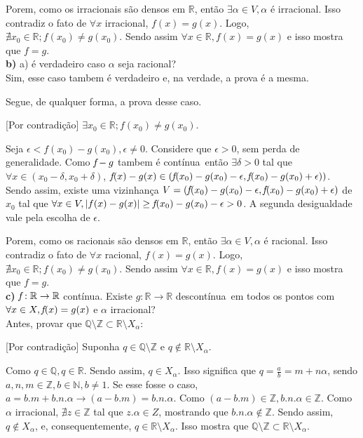 \documentclass[12pt,twoside]{article}
\newcommand{\ent}{então }
\newcommand{\eh}{é }
\newcommand{\sao}{são }
\newcommand{\cont}{contínua}
\newcommand{\contradicao}{contradição}
\newcommand{\vizin}{vizinhança }
\newcommand{\f}{\mkern-2mu f\mkern-3mu}
\newcommand{\R}{\mathbb{R}}
\newcommand{\N}{\mathbb{N}}
\begin{document}
	Porem, como os irracionais \sao densos em $\R$, \ent $\exists \alpha \in V, \alpha$ \eh irracional. Isso contradiz o fato de $\forall x$ irracional, $f(x) = g(x)$. Logo, $\nexists x_0 \in \R; f(x_0) \neq g(x_0)$. Sendo assim $\forall x \in \R, f(x) = g(x)$ e isso mostra que $f = g$.\\
	
	
	\noindent\textbf{b)} a) \eh verdadeiro caso $\alpha$ seja racional?\\
	
	Sim, esse caso tambem \eh verdadeiro e, na verdade, a prova \eh a mesma.
	
	Segue, de qualquer forma, a prova desse caso.
	
	[Por \contradicao] $\exists x_0 \in \R; f(x_0) \neq g(x_0)$.
	
	Seja $\epsilon < f(x_0) - g(x_0), \epsilon \neq 0$. Considere que $\epsilon > 0$, sem perda de generalidade. Como $\f - g$ tambem \eh \cont\, \ent $\exists \delta > 0$ tal que $\forall x \in (x_0 - \delta, x_0 + \delta)$, $\f (x) - g(x) \in (\f (x_0) -g(x_0) - \epsilon, \f (x_0) -g(x_0) + \epsilon))$. Sendo assim, existe uma \vizin $V = (\f (x_0) -g(x_0) - \epsilon, \f (x_0) -g(x_0) + \epsilon)$ de $x_0$ tal que $\forall x \in V, |f(x) - g(x)| \ge \f (x_0) -g(x_0) - \epsilon > 0$. A segunda desigualdade vale pela escolha de $\epsilon$.
	
	Porem, como os racionais \sao densos em $\R$, \ent $\exists \alpha \in V, \alpha$ \eh racional. Isso contradiz o fato de $\forall x$ racional, $f(x) = g(x)$. Logo, $\nexists x_0 \in \R; f(x_0) \neq g(x_0)$. Sendo assim $\forall x \in \R, f(x) = g(x)$ e isso mostra que $f = g$.\\
	
	
	\noindent\textbf{c)} $\f :\R\rightarrow\R$ \cont. Existe $g: \R\rightarrow\R$ des\cont\ em todos os pontos com $\forall x \in X, \f (x) = g(x)$ e $\alpha$ irracional?\\
	
	Antes, provar que $\mathbb{Q}\setminus\mathbb{Z} \subset \R \setminus X_\alpha$:
	
	[Por \contradicao] Suponha $q \in \mathbb{Q}\setminus\mathbb{Z}$ e $q \notin \R \setminus X_\alpha$.
	
	Como $q \in \mathbb{Q}, q \in \R$. Sendo assim, $q \in X_\alpha$. Isso significa que $q = \frac{a}{b} = m + n\alpha$, sendo $a,n,m \in \mathbb{Z}, b\in\N, b\neq 1$. Se esse fosse o caso, $a = b.m + b.n.\alpha \rightarrow (a - b.m) = b.n.\alpha$. Como $(a - b.m) \in \mathbb{Z}, b.n.\alpha\in \mathbb{Z}$. Como $\alpha$ irracional, $\nexists z\in \mathbb{Z}$ tal que $z.\alpha \in Z$, mostrando que $b.n.\alpha\notin \mathbb{Z}$. Sendo assim, $q \notin X_\alpha$, e, consequentemente, $q \in \R \setminus X_\alpha$. Isso mostra que $\mathbb{Q}\setminus\mathbb{Z} \subset \R \setminus X_\alpha$.\\
	
\end{document}
